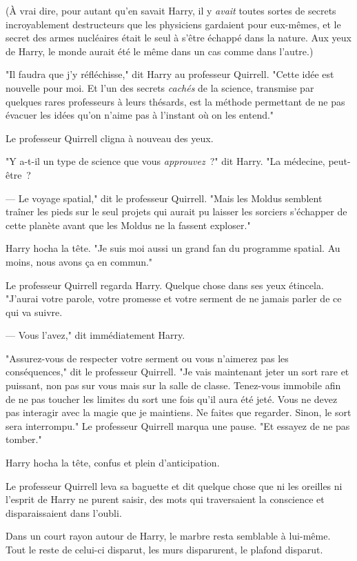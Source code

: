 (À vrai dire, pour autant qu'en savait Harry, il y \emph{avait} toutes sortes de secrets incroyablement destructeurs que les physiciens gardaient pour eux-mêmes, et le secret des armes nucléaires était le seul à s'être échappé dans la nature. Aux yeux de Harry, le monde aurait été le même dans un cas comme dans l'autre.)

"Il faudra que j'y réfléchisse," dit Harry au professeur Quirrell. "Cette idée est nouvelle pour moi. Et l'un des secrets \emph{cachés} de la science, transmise par quelques rares professeurs à leurs thésards, est la méthode permettant de ne pas évacuer les idées qu'on n'aime pas à l'instant où on les entend."

Le professeur Quirrell cligna à nouveau des yeux.

"Y a-t-il un type de science que vous \emph{approuvez}~?" dit Harry. "La médecine, peut-être~?

--- Le voyage spatial," dit le professeur Quirrell. "Mais les Moldus semblent traîner les pieds sur le seul projets qui aurait pu laisser les sorciers s'échapper de cette planète avant que les Moldus ne la fassent exploser."

Harry hocha la tête. "Je suis moi aussi un grand fan du programme spatial. Au moins, nous avons ça en commun."

Le professeur Quirrell regarda Harry. Quelque chose dans ses yeux étincela. "J'aurai votre parole, votre promesse et votre serment de ne jamais parler de ce qui va suivre.

--- Vous l'avez," dit immédiatement Harry.

"Assurez-vous de respecter votre serment ou vous n'aimerez pas les conséquences," dit le professeur Quirrell. "Je vais maintenant jeter un sort rare et puissant, non pas sur vous mais sur la salle de classe. Tenez-vous immobile afin de ne pas toucher les limites du sort une fois qu'il aura été jeté. Vous ne devez pas interagir avec la magie que je maintiens. Ne faites que regarder. Sinon, le sort sera interrompu." Le professeur Quirrell marqua une pause. "Et essayez de ne pas tomber."

Harry hocha la tête, confus et plein d'anticipation.

Le professeur Quirrell leva sa baguette et dit quelque chose que ni les oreilles ni l'esprit de Harry ne purent saisir, des mots qui traversaient la conscience et disparaissaient dans l'oubli.

Dans un court rayon autour de Harry, le marbre resta semblable à lui-même. Tout le reste de celui-ci disparut, les murs disparurent, le plafond disparut.

